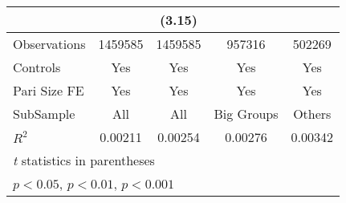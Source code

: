 {\begin{tabular}{l*{4}{c}}
                &                  &   (3.15)         &                  &                  \\
\hline
Observations    &  1459585         &  1459585         &   957316         &   502269         \\
Controls        &      Yes         &      Yes         &      Yes         &      Yes         \\
Pari Size FE    &      Yes         &      Yes         &      Yes         &      Yes         \\
SubSample       &      All         &      All         &Big Groups         &   Others         \\
$ R^2$          &  0.00211         &  0.00254         &  0.00276         &  0.00342         \\
\hline\hline
\multicolumn{5}{l}{\footnotesize \textit{t} statistics in parentheses}\\
\multicolumn{5}{l}{\footnotesize \sym{*} \(p<0.05\), \sym{**} \(p<0.01\), \sym{***} \(p<0.001\)}\\
\end{tabular}
}
